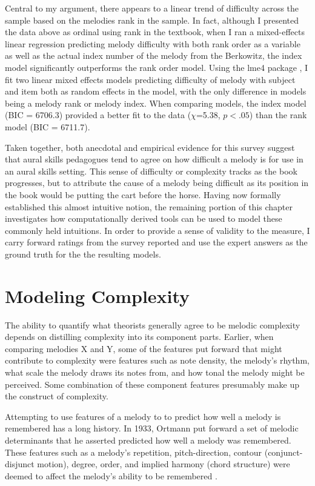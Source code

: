 \documentclass[]{book}
\begin{document}
Central to my argument, there appears to a linear trend of difficulty across the sample based on the melodies rank in the sample.
In fact, although I presented the data above as ordinal using rank in the textbook, when I ran a mixed-effects linear regression predicting melody difficulty with both rank order as a variable as well as the actual index number of the melody from the Berkowitz, the index model significantly outperforms the rank order model.
Using the lme4 package \citep{batesFittingLinearMixedEffects2015}, I fit two linear mixed effects models predicting difficulty of melody with subject and item both as random effects in the model, with the only difference in models being a melody rank or melody index.
When comparing models, the index model (BIC = 6706.3) provided a better fit to the data (\(\chi\)=5.38, \(p<.05\)) than the rank model (BIC = 6711.7).

Taken together, both anecdotal and empirical evidence for this survey suggest that aural skills pedagogues tend to agree on how difficult a melody is for use in an aural skills setting.
This sense of difficulty or complexity tracks as the book progresses, but to attribute the cause of a melody being difficult as its position in the book would be putting the cart before the horse.
Having now formally established this almost intuitive notion, the remaining portion of this chapter investigates how computationally derived tools can be used to model these commonly held intuitions.
In order to provide a sense of validity to the measure, I carry forward ratings from the survey reported and use the expert answers as the ground truth for the the resulting models.

\hypertarget{modeling-complexity}{%
\section{Modeling Complexity}\label{modeling-complexity}}

The ability to quantify what theorists generally agree to be melodic complexity depends on distilling complexity into its component parts.
Earlier, when comparing melodies X and Y, some of the features put forward that might contribute to complexity were features such as note density, the melody's rhythm, what scale the melody draws its notes from, and how tonal the melody might be perceived.
Some combination of these component features presumably make up the construct of complexity.

Attempting to use features of a melody to to predict how well a melody is remembered has a long history.
In 1933, Ortmann put forward a set of melodic determinants that he asserted predicted how well a melody was remembered.
These features such as a melody's repetition, pitch-direction, contour (conjunct-disjunct motion), degree, order, and implied harmony (chord structure) were deemed to affect the melody's ability to be remembered \citep{ortmannTonalDeterminantsMelodic1933}.
\end{document}
